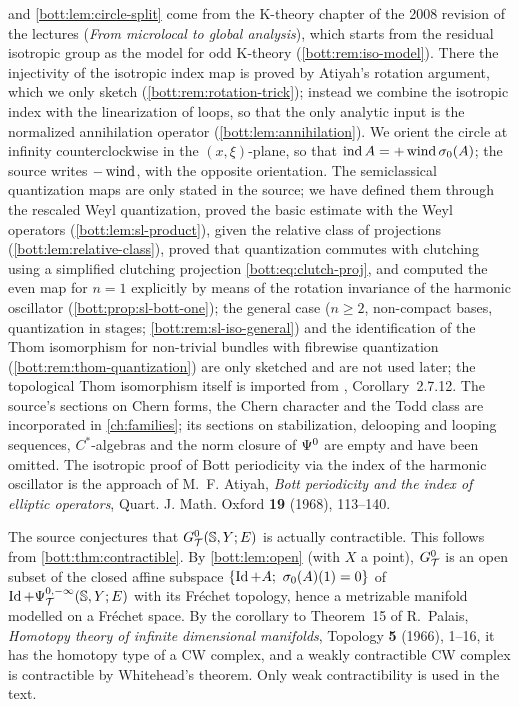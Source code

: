  and
\cref{bott:lem:circle-split} come from the K-theory chapter of the 2008 revision of the
lectures (\emph{From microlocal to global analysis}), which starts from the residual
isotropic group as the model for odd K-theory (\cref{bott:rem:iso-model}). There the injectivity
of the isotropic index map is proved by Atiyah's rotation argument, which we only sketch
(\cref{bott:rem:rotation-trick}); instead we combine the isotropic index with the linearization
of loops, so that the only analytic input is the normalized annihilation operator
(\cref{bott:lem:annihilation}). We orient the circle at infinity counterclockwise in the
$(x,\xi)$-plane, so that $\operatorname{ind} A=+\operatorname{wind}\sigma_0(A)$; the source writes $-\operatorname{wind}$, with the
opposite orientation. The semiclassical quantization maps are only stated in the source;
we have defined them through the rescaled Weyl quantization, proved the basic estimate with
the Weyl operators (\cref{bott:lem:sl-product}), given the relative class of projections
(\cref{bott:lem:relative-class}), proved that quantization commutes with clutching using a
simplified clutching projection \eqref{bott:eq:clutch-proj}, and computed the even map for $n=1$
explicitly by means of the rotation invariance of the harmonic oscillator
(\cref{bott:prop:sl-bott-one}); the general case ($n\ge2$, non-compact bases,
quantization in stages; \cref{bott:rem:sl-iso-general}) and the identification of the Thom
isomorphism for non-trivial bundles with fibrewise quantization
(\cref{bott:rem:thom-quantization}) are only sketched and are not used later; the topological
Thom isomorphism itself is imported from \cite{Atiyah-K}, Corollary~2.7.12. The source's sections on Chern
forms, the Chern character and the Todd class are incorporated in \cref{ch:families}; its
sections on stabilization, delooping and looping sequences, $C^*$-algebras and the norm closure
of $\Psi^{0}$ are empty and have been omitted. The isotropic proof of Bott periodicity via the
index of the harmonic oscillator is the approach of M.~F. Atiyah, \emph{Bott periodicity and the
index of elliptic operators}, Quart. J. Math. Oxford \textbf{19} (1968), 113--140.

The source conjectures that $G^{0}_{\mathcal{T}}(\mathbb{S},Y;E)$ is actually contractible. This follows from
\cref{bott:thm:contractible}. By \cref{bott:lem:open} (with $X$ a point), $G^{0}_{\mathcal{T}}$ is an open subset
of the closed affine subspace $\{\Id+A;\ \sigma_0(A)(1)=0\}$ of $\operatorname{Id}+\Psi^{0,-\infty}_{\mathcal{T}}(\mathbb{S},Y;E)$
with its Fr\'echet topology, hence a metrizable manifold modelled on a Fr\'echet space. By the
corollary to Theorem~15 of R.~Palais, \emph{Homotopy theory of infinite dimensional manifolds},
Topology \textbf{5} (1966), 1--16, it has the homotopy type of a CW complex, and a weakly
contractible CW complex is contractible by Whitehead's theorem. Only weak contractibility is used
in the text.
